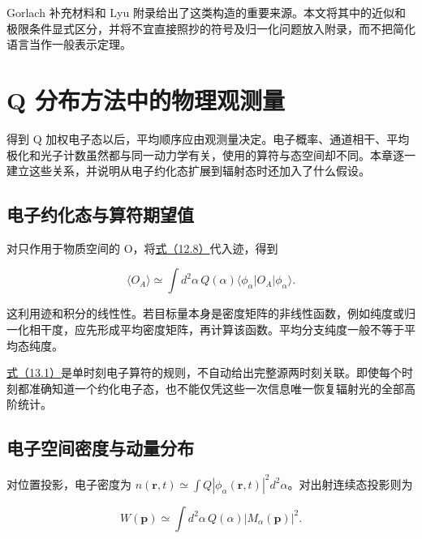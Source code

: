 \documentclass[UTF8,a4paper,zihao=-4,openany,fontset=fandol]{ctexbook}
\begin{document}
Gorlach 补充材料和 Lyu 附录给出了这类构造的重要来源。本文将其中的近似和极限条件显式区分，并将不宜直接照抄的符号及归一化问题放入附录，而不把简化语言当作一般表示定理。



\chapter{Q 分布方法中的物理观测量}\label{ch:13}


得到 Q 加权电子态以后，平均顺序应由观测量决定。电子概率、通道相干、平均极化和光子计数虽然都与同一动力学有关，使用的算符与态空间却不同。本章逐一建立这些关系，并说明从电子约化态扩展到辐射态时还加入了什么假设。



\section{电子约化态与算符期望值}\label{sec:13:1}


对只作用于物质空间的 O，将\hyperref[eq:12.8]{式（12.8）}代入迹，得到



\begin{equation*}
\langle O_A\rangle\simeq\int d^2\alpha\,Q(\alpha)
\langle\phi_\alpha|O_A|\phi_\alpha\rangle.
\tag{13.1}\label{eq:13.1}
\end{equation*}


这利用迹和积分的线性性。若目标量本身是密度矩阵的非线性函数，例如纯度或归一化相干度，应先形成平均密度矩阵，再计算该函数。平均分支纯度一般不等于平均态纯度。



\hyperref[eq:13.1]{式（13.1）}是单时刻电子算符的规则，不自动给出完整源两时刻关联。即使每个时刻都准确知道一个约化电子态，也不能仅凭这些一次信息唯一恢复辐射光的全部高阶统计。



\section{电子空间密度与动量分布}\label{sec:13:2}


对位置投影，电子密度为 $n(\mathbf r,t)\simeq\int Q|\phi_\alpha(\mathbf r,t)|^2d^2\alpha$。对出射连续态投影则为



\begin{equation*}
W(\mathbf p)\simeq\int d^2\alpha\,Q(\alpha)|M_\alpha(\mathbf p)|^2.
\tag{13.2}\label{eq:13.2}
\end{equation*}
\end{document}
